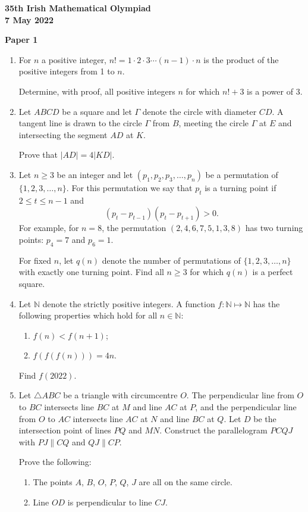 \documentclass[12pt]{article}
\begin{document}
\begin{center}
{\large\bfseries 35th Irish Mathematical Olympiad\\7 May 2022}
\end{center}
\bigskip\noindent\textbf{Paper 1}\bigskip
\begin{enumerate}
\item For $n$ a positive integer, $n! = 1 \cdot 2 \cdot 3 \cdots (n-1) \cdot n$ is the product of the positive integers from 1 to $n$.

Determine, with proof, all positive integers $n$ for which $n! + 3$ is a power of 3.

\item Let $ABCD$ be a square and let $\Gamma$ denote the circle with diameter $CD$. A tangent line is drawn to the circle $\Gamma$ from $B$, meeting the circle $\Gamma$ at $E$ and intersecting the segment $AD$ at $K$.

Prove that $|AD| = 4|KD|$.

\item Let $n \ge 3$ be an integer and let $(p_1, p_2, p_3, \ldots, p_n)$ be a permutation of $\{1, 2, 3, \ldots, n\}$. For this permutation we say that $p_t$ is a turning point if $2 \le t \le n - 1$ and
\[
(p_t - p_{t-1})(p_t - p_{t+1}) > 0.
\]
For example, for $n = 8$, the permutation $(2, 4, 6, 7, 5, 1, 3, 8)$ has two turning points: $p_4 = 7$ and $p_6 = 1$.

For fixed $n$, let $q(n)$ denote the number of permutations of $\{1, 2, 3, \ldots, n\}$ with exactly one turning point. Find all $n \ge 3$ for which $q(n)$ is a perfect square.

\item Let $\mathbb{N}$ denote the strictly positive integers. A function $f : \mathbb{N} \mapsto \mathbb{N}$ has the following properties which hold for all $n \in \mathbb{N}$:
\begin{enumerate}
\item[(a)] $f(n) < f(n+1)$;
\item[(b)] $f(f(f(n))) = 4n$.
\end{enumerate}
Find $f(2022)$.

\item Let $\triangle ABC$ be a triangle with circumcentre $O$. The perpendicular line from $O$ to $BC$ intersects line $BC$ at $M$ and line $AC$ at $P$, and the perpendicular line from $O$ to $AC$ intersects line $AC$ at $N$ and line $BC$ at $Q$. Let $D$ be the intersection point of lines $PQ$ and $MN$. Construct the parallelogram $PCQJ$ with $PJ \parallel CQ$ and $QJ \parallel CP$.

Prove the following:
\begin{enumerate}
\item[(a)] The points $A$, $B$, $O$, $P$, $Q$, $J$ are all on the same circle.
\item[(b)] Line $OD$ is perpendicular to line $CJ$.
\end{enumerate}
\end{enumerate}
\end{document}
